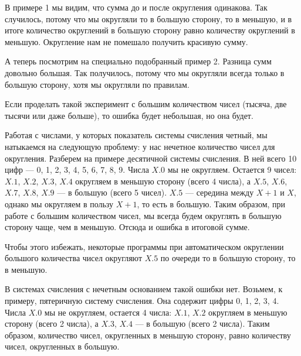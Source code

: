 В примере 1 мы видим, что сумма до и после округления одинакова.
Так случилось, потому что мы округляли то в большую сторону, то в меньшую, и в итоге количество округлений в большую сторону равно количеству округлений в меньшую.
Округление нам не помешало получить красивую сумму.

А теперь посмотрим на специально подобранный пример 2.
Разница сумм довольно большая.
Так получилось, потому что мы округляли всегда только в большую сторону, хотя мы округляли по правилам.

Если проделать такой эксперимент с большим количеством чисел (тысяча, две тысячи или даже больше), то ошибка будет небольшая, но она будет.

Работая с числами, у которых показатель системы счисления четный, мы натыкаемся на следующую проблему: у нас нечетное количество чисел для округления.
Разберем на примере десятичной системы счисления.
В ней всего 10 цифр --- 0, 1, 2, 3, 4, 5, 6, 7, 8, 9.
Числа $X.0$ мы не округляем.
Остается 9 чисел: $X.1$, $X.2$, $X.3$, $X.4$ округляем в меньшую сторону (всего 4 числа), а $X.5$, $X.6$, $X.7$, $X.8$, $X.9$ --- в большую (всего 5 чисел).
$X.5$ --- середина между $X+1$ и $X$, однако мы округляем в пользу $X+1$, то есть в большую.
Таким образом, при работе с большим количеством чисел, мы всегда будем округлять в большую сторону чаще, чем в меньшую.
Отсюда и ошибка в итоговой сумме.

Чтобы этого избежать, некоторые программы при автоматическом округлении большого количества чисел округляют $X.5$ по очереди то в большую сторону, то в меньшую.

В системах счисления с нечетным основанием такой ошибки нет.
Возьмем, к примеру, пятеричную систему счисления.
Она содержит цифры 0, 1, 2, 3, 4.
Числа $X.0$ мы не округляем, остается 4 числа: $X.1$, $X.2$ округляем в меньшую сторону (всего 2 числа), а $X.3$, $X.4$ --- в большую (всего 2 числа).
Таким образом, количество чисел, округленных в меньшую сторону, равно количеству чисел, округленных в большую.
